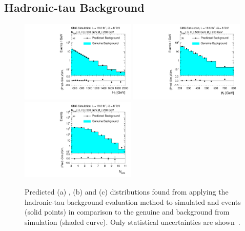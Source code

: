 \subsection{Hadronic-tau Background}
\label{subsec:RA2_tauhad}
\begin{figure}[!t]
  \centering

  \begin{minipage}[c]{1.\textwidth}
    \begin{center}
      \includegraphics[width=0.49\textwidth]{figures/RA2_TauHad1.pdf}%
      \includegraphics[width=0.49\textwidth]{figures/RA2_TauHad2.pdf}\\ 
      \includegraphics[width=0.49\textwidth]{figures/RA2_TauHad3.pdf}
    \end{center}
  \end{minipage}

  \caption{Predicted (a) \HT, (b) \MHT and (c) \NJets distributions found from applying the hadronic-tau background evaluation method to simulated \ttbar and \WJets events (solid points) in comparison to the genuine \ttbar and \WJets background from simulation (shaded curve). Only statistical uncertainties are shown~\cite{Chatrchyan:2014lfa}.}
  \label{fig:ra2_tauhad}
\end{figure}
